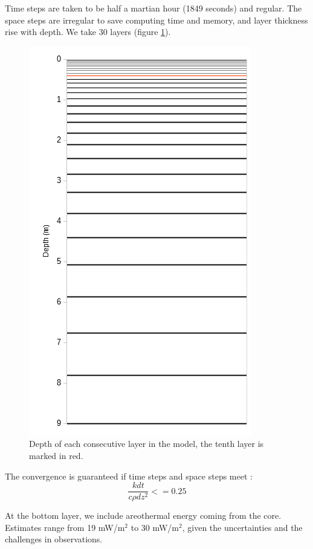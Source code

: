 \documentclass{report}
\begin{document}
Time steps are taken to be half a martian hour (1849 seconds) and regular. The space steps are irregular to save computing time and memory, and layer thickness rise with depth. We take 30 layers (figure \ref{profondef}). 

\begin{figure}
    \centering
    \includegraphics{profondef.png}
    \caption{Depth of each consecutive layer in the model, the tenth layer is marked in red.}
    \label{profondef}
\end{figure}{}

The convergence is guaranteed if time steps and space steps meet : \[\frac{k dt}{c\rho dz^2}<=0.25\]

At the bottom layer, we include areothermal energy coming from the core. Estimates range from 19 mW/m$^2$ to 30 mW/m$^2$, given the uncertainties and the challenges in observations.
\end{document}
